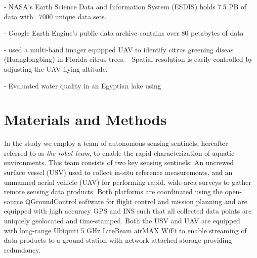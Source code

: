 \documentclass[journal,article,submit,pdftex,moreauthors]{Definitions/mdpi}
\begin{document}
- \cite{chi2016big} NASA's Earth Science Data and Information System (ESDIS) holds 7.5 PB of data with ~7000 unique data sets.

- Google Earth Engine's public data archive contains over 80 petabytes of data 

- \cite{garcia2013comparison} used a multi-band imager equipped UAV to identify citrus greening diseas (Huanglongbing) in Florida citrus trees.
- Spatial resolution is easily controlled by adjusting the UAV flying altitude.

- \cite{rostom2017evaluation} Evaluated water quality in an Egyptian lake using 





\section{Materials and Methods}

In the study we employ a team of autonomous sensing sentinels, hereafter referred to as \textit{the robot team}, to enable the rapid characterization of aquatic environments. This team consists of two key sensing sentinels: An uncrewed surface vessel (USV) used to collect in-situ reference measurements, and an unmanned aerial vehicle (UAV) for performing rapid, wide-area surveys to gather remote sensing data products. Both platforms are coordinated using the open-source QGroundControl software for flight control and mission planning \cite{qgroundcontrol} and are equipped with high accuracy GPS and INS such that all collected data points are uniquely geolocated and time-stamped. Both the USV and UAV are equipped with long-range Ubiquiti 5 GHz LiteBeam airMAX WiFi to enable streaming of data products to a ground station with network attached storage providing redundancy.
\end{document}
